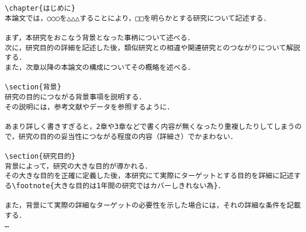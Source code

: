 \begin{breakbox}
{\footnotesize
\begin{verbatim}
\chapter{はじめに}
本論文では，○○○を△△△することにより，□□を明らかとする研究について記述する．

まず，本研究をおこなう背景となった事柄について述べる．
次に，研究目的の詳細を記述した後，類似研究との相違や関連研究とのつながりについて解説する．
また，次章以降の本論文の構成についてその概略を述べる．

\section{背景}
研究の目的につながる背景事項を説明する．
その説明には，参考文献やデータを参照するように．

あまり詳しく書きすぎると，2章や3章などで書く内容が無くなったり重複したりしてしまうので，研究の目的の妥当性につながる程度の内容（詳細さ）でかまわない．

\section{研究目的}
背景によって，研究の大きな目的が導かれる．
その大きな目的を正確に定義した後，本研究にて実際にターゲットとする目的を詳細に記述する\footnote{大きな目的は1年間の研究ではカバーしきれない為}．

また，背景にて実際の詳細なターゲットの必要性を示した場合には，それの詳細な条件を記載する．
…
\end{verbatim}
}
\end{breakbox}
